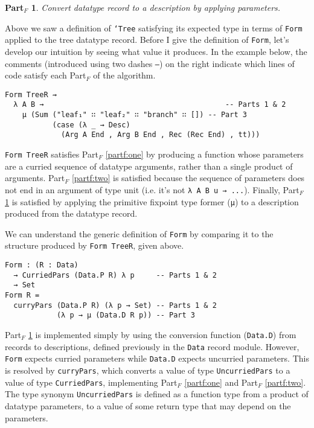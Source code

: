 \documentclass[runningheads,a4paper]{llncs}
\newtheorem{mypartf}{Part$_F$}
\newcommand{\refpartf}[1]{Part$_F$ \ref{partf:#1}}
\begin{document}
\begin{mypartf}
\label{partf:three}
Convert datatype record to a description by applying parameters.
\end{mypartf}

Above we saw a definition of {\tt `Tree} satisfying its expected type
in terms of {\tt Form} applied to the tree datatype record.
Before I give the definition of {\tt Form}, let's develop our
intuition by seeing what value it produces. In the example below, the
comments (introduced using two dashes {\tt --}) on the right indicate
which lines of code satisfy each Part$_F$ of the algorithm.

\begin{verbatim}
Form TreeR ⇝
  λ A B →                                          -- Parts 1 & 2
    μ (Sum ("leaf₁" ∷ "leaf₂" ∷ "branch" ∷ []) -- Part 3
           (case (λ _ → Desc)
             (Arg A End , Arg B End , Rec (Rec End) , tt)))
\end{verbatim}

{\tt Form TreeR} satisfies \refpartf{one} by producing a function
whose parameters are a curried sequence of datatype arguments, rather
than a single product of arguments. \refpartf{two}
is satisfied because the sequence of parameters does not end in an
argument of type unit (i.e. it's not {\tt λ A B u → ...}).
Finally, \refpartf{three} is satisfied by
applying the primitive fixpoint type former ({\tt μ}) to a description produced
from the datatype record.

We can
understand the generic definition of {\tt Form} by comparing it
to the structure produced by {\tt Form TreeR}, given above.

\begin{verbatim}
Form : (R : Data)
  → CurriedPars (Data.P R) λ p     -- Parts 1 & 2
  → Set
Form R =
  curryPars (Data.P R) (λ p → Set) -- Parts 1 & 2
            (λ p → μ (Data.D R p)) -- Part 3
\end{verbatim}

\refpartf{three} is implemented simply by using the conversion
function ({\tt Data.D}) from records to descriptions, defined
previously in the {\tt Data} record module.
However, {\tt Form} expects
curried parameters while {\tt Data.D} expects uncurried parameters.
This is resolved by {\tt curryPars}, which converts a value of
type {\tt UncurriedPars} to a value of type {\tt CurriedPars}, implementing
\refpartf{one} and \refpartf{two}.
The type synonym {\tt UncurriedPars}
is defined as a function type from a product of datatype parameters,
to a value of some return type that may depend on the parameters.
\end{document}
